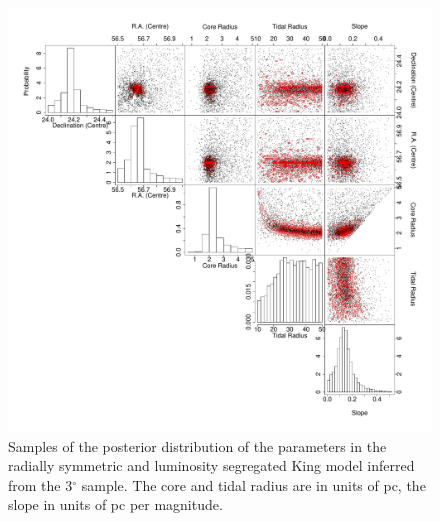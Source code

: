 \begin{figure}[ht!]
 \centering
  \includegraphics[width=\textwidth]{background/Figures/PSD/KingRS7.pdf}
  \caption{Samples of the posterior distribution of the parameters in the radially symmetric and luminosity segregated King model inferred from the 3$^{\circ}$ sample. The core and tidal radius are in units of pc, the slope in units of pc per magnitude.}
\label{fig:KingRS7}
\end {figure}

